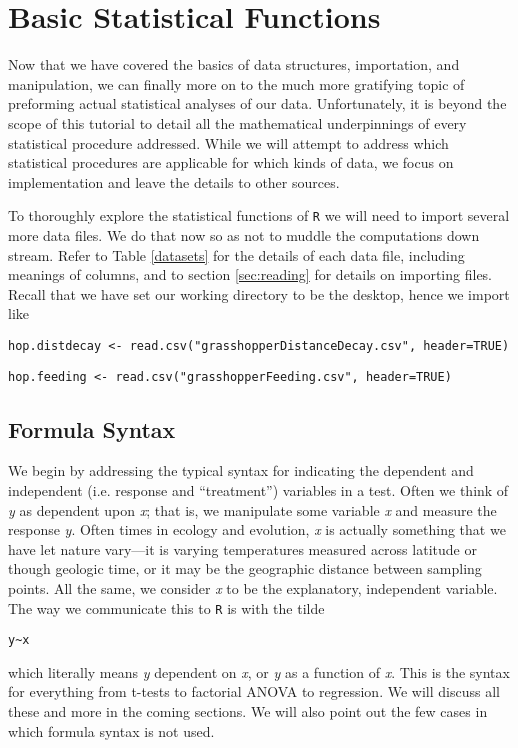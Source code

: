 \documentclass[12pt]{article}
\newcommand{\R}[1] {
	\item \texttt{#1}
}
\newenvironment{verbatim}{ 
	\indent
	\begin{list}{}{\setlength{\itemsep}{-1.5mm}}
}{
	\end{list}
}
\begin{document}
\section{Basic Statistical Functions}
Now that we have covered the basics of data structures, importation, and manipulation, we can finally more on to the much more gratifying topic of preforming actual statistical analyses of our data.  Unfortunately, it is beyond the scope of this tutorial to detail all the mathematical underpinnings of every statistical procedure addressed.  While we will attempt to address which statistical procedures are applicable for which kinds of data, we focus on implementation and leave the details to other sources.

To thoroughly explore the statistical functions of \verb+R+ we will need to import several more data files.  We do that now so as not to muddle the computations down stream.  Refer to Table \ref{datasets} for the details of each data file, including meanings of columns, and to section \ref{sec:reading} for details on importing files.  Recall that we have set our working directory to be the desktop, hence we import like
\begin{verbatim}
	\R{hop.distdecay <- read.csv("grasshopperDistanceDecay.csv", header=TRUE)}
	\R{hop.feeding <- read.csv("grasshopperFeeding.csv", header=TRUE)}
\end{verbatim}

\subsection{Formula Syntax}
We begin by addressing the typical syntax for indicating the dependent and independent (i.e. response and ``treatment'') variables in a test.  Often we think of \emph{y} as dependent upon \emph{x}; that is, we manipulate some variable \emph{x} and measure the response \emph{y}.  Often times in ecology and evolution, \emph{x} is actually something that we have let nature vary---it is varying temperatures measured across latitude or though geologic time, or it may be the geographic distance between sampling points.  All the same, we consider \emph{x} to be the explanatory, independent variable.  The way we communicate this to \verb+R+ is with the tilde
\begin{verbatim}
	\R{y\~{}x}
\end{verbatim}
which literally means \emph{y} dependent on \emph{x}, or \emph{y} as a function of \emph{x}.  This is the syntax for everything from t-tests to factorial ANOVA to regression.  We will discuss all these and more in the coming sections.  We will also point out the few cases in which formula syntax is not used.
\end{document}
